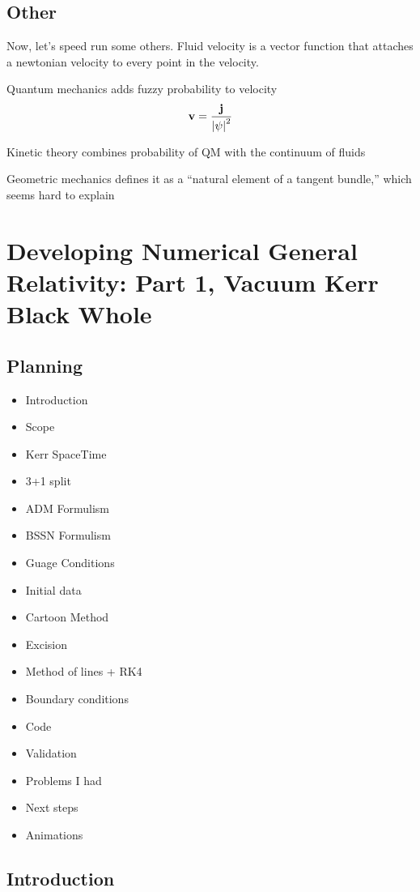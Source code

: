 \subsection{Other}

Now, let's speed run some others. Fluid velocity is a vector function that attaches a newtonian velocity to every point in the velocity.

Quantum mechanics adds fuzzy probability to velocity
\[
	\mathbf{v} = \frac{\mathbf{j}}{\abs{\psi}^2}
\]

Kinetic theory combines probability of QM with the continuum of fluids

Geometric mechanics defines it as a ``natural element of a tangent bundle,'' which seems hard to explain





\section{Developing Numerical General Relativity: Part 1, Vacuum Kerr Black Whole}

\subsection{Planning}
\begin{itemize}
	\item Introduction
	\item Scope
	\item Kerr SpaceTime
	\item 3+1 split
	\item ADM Formulism
	\item BSSN Formulism
	\item Guage Conditions
	\item Initial data
	\item Cartoon Method
	\item Excision
	\item Method of lines + RK4
	\item Boundary conditions
	\item Code
	\item Validation
	\item Problems I had
	\item Next steps
	\item Animations
\end{itemize}

\subsection{Introduction}

